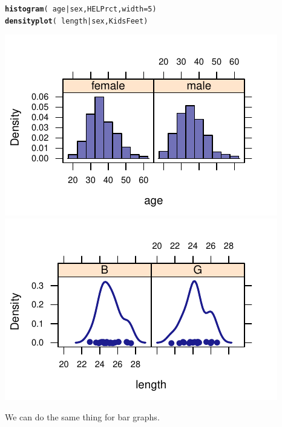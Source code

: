 \documentclass[twoside]{book}\usepackage[]{graphicx}\usepackage[]{xcolor}
\makeatletter
\def\maxwidth{ %
  \ifdim\Gin@nat@width>\linewidth
    \linewidth
  \else
    \Gin@nat@width
  \fi
}
\newcommand{\hlnum}[1]{\textcolor[rgb]{0.686,0.059,0.569}{#1}}%
\newcommand{\hlopt}[1]{\textcolor[rgb]{0,0,0}{#1}}%
\newcommand{\hlstd}[1]{\textcolor[rgb]{0.345,0.345,0.345}{#1}}%
\newcommand{\hlkwc}[1]{\textcolor[rgb]{0.333,0.667,0.333}{#1}}%
\newcommand{\hlkwd}[1]{\textcolor[rgb]{0.737,0.353,0.396}{\textbf{#1}}}%
\newenvironment{kframe}{%
 \def\at@end@of@kframe{}%
 \ifinner\ifhmode%
  \def\at@end@of@kframe{\end{minipage}}%
  \begin{minipage}{\columnwidth}%
 \fi\fi%
 \def\FrameCommand##1{\hskip\@totalleftmargin \hskip-\fboxsep
 \colorbox{shadecolor}{##1}\hskip-\fboxsep
     \hskip-\linewidth \hskip-\@totalleftmargin \hskip\columnwidth}%
 \MakeFramed {\advance\hsize-\width
   \@totalleftmargin\z@ \linewidth\hsize
   \@setminipage}}%
 {\par\unskip\endMakeFramed%
 \at@end@of@kframe}
\newenvironment{knitrout}{}{} %
\makeatother
\begin{document}
\begin{knitrout}
\color{fgcolor}\begin{kframe}
\begin{alltt}
\hlkwd{histogram}\hlstd{(}\hlopt{~}\hlstd{age} \hlopt{|} \hlstd{sex, HELPrct,} \hlkwc{width} \hlstd{=} \hlnum{5}\hlstd{)}
\hlkwd{densityplot}\hlstd{(}\hlopt{~}\hlstd{length} \hlopt{|} \hlstd{sex, KidsFeet)}
\end{alltt}
\end{kframe}

{\centering \includegraphics[width=\maxwidth]{figures/fig-compare-ages-1} 
\includegraphics[width=\maxwidth]{figures/fig-compare-ages-2} 

}



\end{knitrout}


We can do the same thing for bar graphs.
\end{document}
